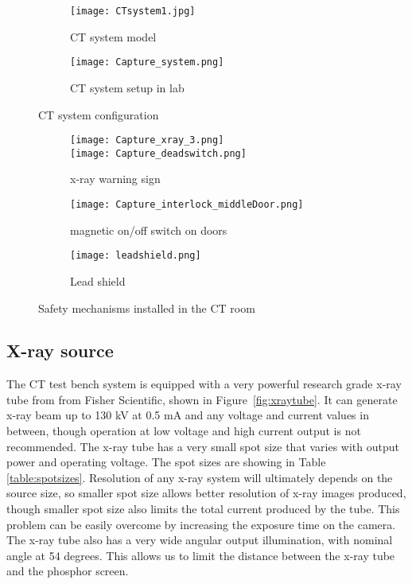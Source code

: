 \begin{figure}
	\begin{subfigure}[b]{0.4\linewidth}
	\centering
	\texttt{[image: CTsystem1.jpg]}
	\caption{CT system model}
	\label{fig:CTmodel}
	\end{subfigure}
\hspace{0.2cm}
	\begin{subfigure}[b]{0.4\linewidth}
	\centering
	\texttt{[image: Capture\_system.png]}
	\caption{CT system setup in lab}
	\label{fig:CTlab}
	\end{subfigure}
\caption{CT system configuration}
\label{fig:CTsystem}
\end{figure}

\begin{figure}
	\centering
	\begin{subfigure}[b]{0.3\linewidth}
	\texttt{[image: Capture\_xray\_3.png]} \\
	\vspace{0.2cm}
	\texttt{[image: Capture\_deadswitch.png]}
	\caption{x-ray warning sign}
	\label{fig:xraywarningsign}
	\end{subfigure}
\hspace{0.2cm}
	\begin{subfigure}[b]{0.3\linewidth}
	\centering
	\texttt{[image: Capture\_interlock\_middleDoor.png]}
	\caption{magnetic on/off switch on doors}
	\label{fig:doorinterlock}
	\end{subfigure}
\hspace{0.2cm}
	\begin{subfigure}[b]{0.3\linewidth}
	\centering
	\texttt{[image: leadshield.png]}
	\caption{Lead shield}
	\label{fig:leadshield}
	\end{subfigure}
\caption{Safety mechanisms installed in the CT room}
\label{fig:safety}
\end{figure}


\subsection{X-ray source}
The CT test bench system is equipped with a very powerful research grade x-ray tube from from Fisher Scientific, shown in Figure~\ref{fig:xraytube}.  It can generate x-ray beam up to 130 kV at 0.5 mA and any voltage and current values in between, though operation at low voltage and high current output is not recommended.  The x-ray tube has a very small spot size that varies with output power and operating voltage.  The spot sizes are showing in Table \ref{table:spotsizes}.  Resolution of any x-ray system will ultimately depends on the source size, so smaller spot size allows better resolution of x-ray images produced, though smaller spot size also limits the total current produced by the tube.  This problem can be easily overcome by increasing the exposure time on the camera.  The x-ray tube also has a very wide angular output illumination, with nominal angle at 54 degrees.  This allows us to limit the distance between the x-ray tube and the phosphor screen.

